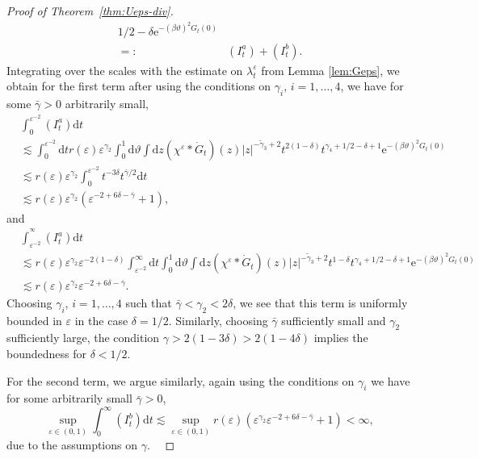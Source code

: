 \documentclass[11pt, a4paper]{scrartcl}
\numberwithin{equation}{section}
\theoremstyle{plain}
\theoremstyle{remark}
\newcommand{\backassign}{=:}
\newcommand{\mathd}{\mathrm{d}}
\newcommand{\mathe}{\mathrm{e}}
\begin{document}
\begin{proof}[Proof of Theorem~\ref{thm:Ueps-div}]
\[\begin{aligned}
{			1 / 2 - \delta} \mathe^{- (\beta \vartheta)^2 G_t (0)}                                                                         \\
			\backassign                                                  & (I^a_t) + (I^b_t) .
		\end{aligned} \]
	Integrating over the scales with the estimate on $\lambda^{\varepsilon}_t$
	from Lemma \ref{lem:Geps}, we obtain for the first term after using the
	conditions on $\gamma_i$, $i = 1, \ldots, 4$, we have for some $\bar{\gamma}
		> 0$ arbitrarily small,
	\[ \begin{aligned}
			 & \int_0^{\varepsilon^{- 2}} (I^a_t) \mathd t                        \\ & \lesssim
			\int_0^{\varepsilon^{- 2}} \mathd t r (\varepsilon)
			\varepsilon^{\gamma_2} \int_0^1 \mathd \vartheta \int \mathd z
			(\chi^{\varepsilon} \ast \dot{G}_t ) (z) | z |^{- \tilde{\gamma}_3 + 2}
			t^{2 (1 - \delta)} t^{\gamma_4 + 1 / 2 - \delta + 1} \mathe^{- (\beta
			\vartheta)^2 G_t (0)}                                                 \\
			 & \lesssim  r (\varepsilon) \varepsilon^{\gamma_2}
			\int_0^{\varepsilon^{- 2}} t^{- 3 \delta} t^{\bar{\gamma} / 2} \mathd
			t                                                                     \\
			 & \lesssim  r (\varepsilon) \varepsilon^{\gamma_2} (\varepsilon^{- 2
				+ 6 \delta - \bar{\gamma}} + 1) ,
		\end{aligned} \]
	and
	\[ \begin{aligned}
			 & \int_{\varepsilon^{- 2}}^{^{\infty}} (I^a_t) \mathd t
			\\
			 & \lesssim  r
			(\varepsilon) \varepsilon^{\gamma_2} \varepsilon^{- 2 (1 - \delta)}
			\int^{\infty}_{\varepsilon^{- 2}} \mathd t \int_0^1 \mathd \vartheta
			\int \mathd z (\chi^{\varepsilon} \ast \dot{G}_t ) (z) | z |^{-
					\tilde{\gamma}_3 + 2} t^{1 - \delta} t^{\gamma_4 + 1 / 2 - \delta + 1}
			\mathe^{- (\beta \vartheta)^2 G_t (0)}                                 \\
			 & \lesssim  r (\varepsilon) \varepsilon^{\gamma_2} \varepsilon^{- 2 +
				6 \delta - \bar{\gamma}} .
		\end{aligned} \]
	Choosing $\gamma_i$, $i = 1, \ldots, 4$ such that $\bar{\gamma} < \gamma_2 <
		2 \delta$, we see that this term is uniformly bounded in $\varepsilon$ in
	the case $\delta = 1 / 2$. Similarly, choosing $\bar{\gamma}$ sufficiently
	small and $\gamma_2$ sufficiently large, the condition $\gamma > 2 (1 - 3
		\delta) > 2 (1 - 4 \delta)$ implies the boundedness for $\delta < 1 / 2$.

	For the second term, we argue similarly, again using the conditions on
	$\gamma_i$ we have for some arbitrarily small $\bar{\gamma} > 0$,
	\[ \sup_{\varepsilon \in (0, 1)} \int_0^{\infty} (I_t^b) \mathd t \lesssim
		\sup_{\varepsilon \in (0, 1)} r (\varepsilon) (\varepsilon^{\gamma_2}
		\varepsilon^{- 2 + 6 \delta - \bar{\gamma}} + 1) < \infty, \]
	due to the assumptions on $\gamma$. \
\end{proof}
\end{document}
